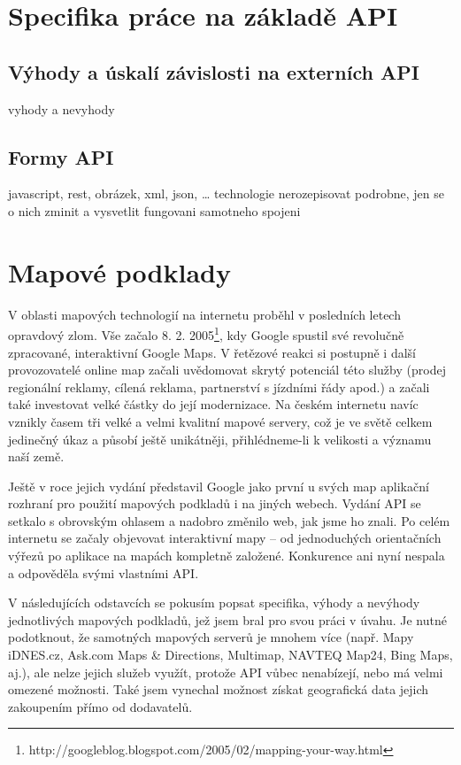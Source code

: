 \section{Specifika práce na základě API}
\subsection{Výhody a úskalí závislosti na externích API}
vyhody a nevyhody
\subsection{Formy API}
javascript, rest, obrázek, xml, json, \ldots
technologie nerozepisovat podrobne, jen se o nich zminit a vysvetlit
fungovani samotneho spojeni

\section{Mapové podklady}
V oblasti mapových technologií na internetu proběhl v
posledních letech opravdový zlom. Vše začalo 8. 2.
2005\footnote{http://googleblog.blogspot.com/2005/02/mapping-your-way.html},
kdy Google spustil své revolučně zpracované, interaktivní Google Maps.
V řetězové reakci si postupně i další provozovatelé online map začali
uvědomovat skrytý potenciál této služby (prodej regionální reklamy,
cílená reklama, partnerství s jízdními řády apod.) a začali také
investovat velké částky do její modernizace. Na českém internetu
navíc vznikly časem tři velké a velmi kvalitní mapové servery, což je
ve světě celkem jedinečný úkaz a působí ještě unikátněji,
přihlédneme-li k velikosti a významu naší země.

Ještě v roce jejich vydání představil Google jako první u svých
map aplikační rozhraní pro použití mapových podkladů i na jiných
webech. Vydání API se setkalo s obrovským ohlasem a nadobro změnilo
web, jak jsme ho znali. Po celém internetu se začaly objevovat
interaktivní mapy -- od jednoduchých orientačních výřezů po aplikace
na mapách kompletně založené. Konkurence ani nyní nespala a odpověděla
svými vlastními API.

V následujících odstavcích se pokusím popsat specifika, výhody a
nevýhody jednotlivých mapových podkladů, jež jsem bral pro svou práci
v úvahu. Je nutné podotknout, že samotných mapových serverů je mnohem
více (např. Mapy iDNES.cz, Ask.com Maps \& Directions, Multimap,
NAVTEQ Map24, Bing Maps, aj.), ale nelze jejich služeb využít,
protože API vůbec nenabízejí, nebo má velmi omezené možnosti. Také
jsem vynechal možnost získat geografická data jejich zakoupením přímo
od dodavatelů.

